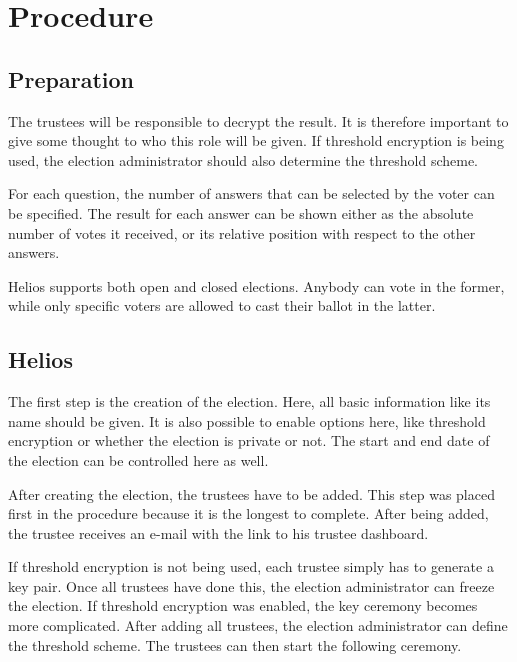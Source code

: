 % 
%

\section{Procedure}
\label{sec:procedure}

\subsection{Preparation}

The trustees will be responsible to decrypt the result. It is therefore important to give some thought to who this role will be given. If threshold encryption is being used, the election administrator should also determine the threshold scheme.

\par For each question, the number of answers that can be selected by the voter can be specified. The result for each answer can be shown either as the absolute number of votes it received, or its relative position with respect to the other answers.

\par Helios supports both open and closed elections. Anybody can vote in the former, while only specific voters are allowed to cast their ballot in the latter.

\subsection{Helios}

The first step is the creation of the election. Here, all basic information like its name should be given. It is also possible to enable options here, like threshold encryption or whether the election is private or not. The start and end date of the election can be controlled here as well.

\par After creating the election, the trustees have to be added. This step was placed first in the procedure because it is the longest to complete. After being added, the trustee receives an e-mail with the link to his trustee dashboard.

\par If threshold encryption is not being used, each trustee simply has to generate a key pair. Once all trustees have done this, the election administrator can freeze the election. If threshold encryption was enabled, the key ceremony becomes more complicated. After adding all trustees, the election administrator can define the threshold scheme. The trustees can then start the following ceremony.


